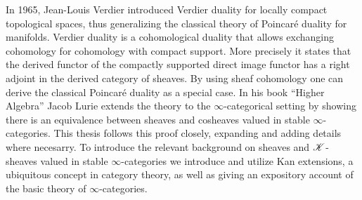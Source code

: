 \documentclass[../../thesis.tex]{subfiles}
\begin{document}
In 1965, Jean-Louis Verdier introduced Verdier duality for locally compact topological spaces, thus generalizing the classical theory of Poincaré duality for manifolds.
Verdier duality is a cohomological duality that allows exchanging cohomology for cohomology with compact support.
More precisely it states that the derived functor of the compactly supported direct image functor has a right adjoint in the derived category of sheaves.
By using sheaf cohomology one can derive the classical Poincaré duality as a special case.
In his book ``Higher Algebra'' Jacob Lurie extends the theory to the $\infty$-categorical setting by showing there is an equivalence between sheaves and cosheaves valued in stable $\infty$-categories.
This thesis follows this proof closely, expanding and adding details where necesarry.
To introduce the relevant background on sheaves and $\mathscr{K}$-sheaves valued in stable $\infty$-categories we introduce and utilize Kan extensions, a ubiquitous concept in category theory, as well as giving an expository account of the basic theory of $\infty$-categories.
\end{document}
